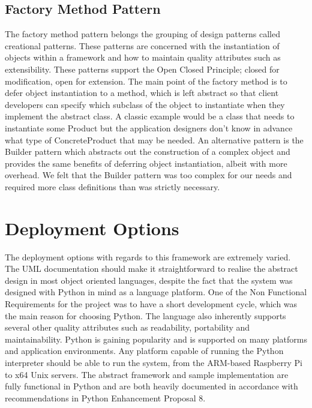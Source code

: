 \documentclass[11pt]{report}
\begin{document}
	\subsection{Factory Method Pattern}
	The factory method pattern belongs the grouping of design patterns called creational patterns. These patterns are concerned with the instantiation of objects within a framework and how to maintain quality attributes such as extensibility. These patterns support the Open Closed Principle; closed for modification, open for extension. The main point of the factory method is to defer object instantiation to a method, which is left abstract so that client developers can specify which subclass of the object to instantiate when they implement the abstract class. A classic example would be a class that needs to instantiate some Product but the application designers don't know in advance what type of ConcreteProduct that may be needed. An alternative pattern is the Builder pattern which abstracts out the construction of a complex object and provides the same benefits of deferring object instantiation, albeit with more overhead. We felt that the Builder pattern was too complex for our needs and required more class definitions than was strictly necessary. 

\section{Deployment Options}
The deployment options with regards to this framework are extremely varied. The UML documentation should make it straightforward to realise the abstract design in most object oriented languages, despite the fact that the system was designed with Python in mind as a language platform. One of the Non Functional Requirements for the project was to have a short development cycle, which was the main reason for choosing Python. The language also inherently supports several other quality attributes such as readability, portability and maintainability. Python is gaining popularity and is supported on many platforms and application environments. Any platform capable of running the Python interpreter should be able to run the system, from the ARM-based Raspberry Pi to x64 Unix servers. The abstract framework and sample implementation are fully functional in Python and are both heavily documented in accordance with recommendations in Python Enhancement Proposal 8. 
\end{document}
